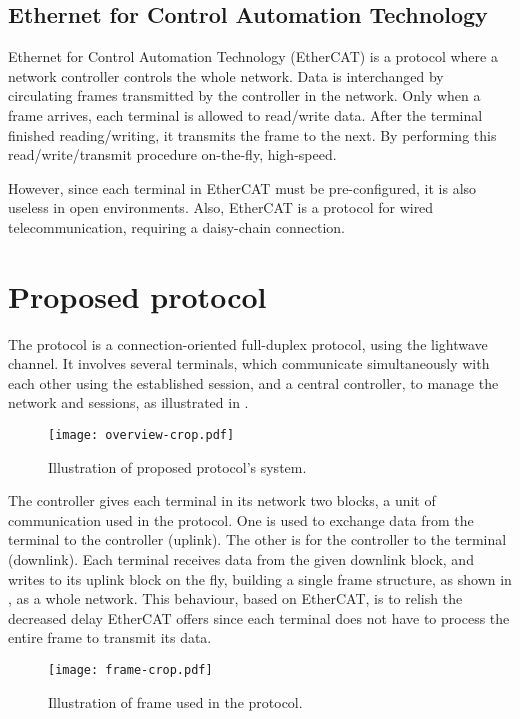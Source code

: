 ﻿\documentclass[twocolumn,9pt]{ltjsarticle}
\renewcommand{\ref}{\Cref}
\begin{document}
\subsection{Ethernet for Control Automation Technology}
Ethernet for Control Automation Technology (EtherCAT) is a protocol where a network controller controls the whole network.
Data is interchanged by circulating frames transmitted by the controller in the network.
Only when a frame arrives, each terminal is allowed to read/write data.
After the terminal finished reading/writing, it transmits the frame to the next.
By performing this read/write/transmit procedure on-the-fly, high-speed.

However, since each terminal in EtherCAT must be pre-configured, it is also useless in open environments.
Also, EtherCAT is a protocol for wired telecommunication, requiring a daisy-chain connection.

\section{Proposed protocol}
The protocol is a connection-oriented full-duplex protocol, using the lightwave channel.
It involves several terminals, which communicate simultaneously with each other using the established session, and a central controller, to manage the network and sessions, as illustrated in \ref{fig:overview}.

\begin{figure}[tb]
  \centering
  \texttt{[image: overview-crop.pdf]}
  \caption{\label{fig:overview}
    Illustration of proposed protocol's system.
  }
\end{figure}

The controller gives each terminal in its network two blocks, a unit of communication used in the protocol.
One is used to exchange data from the terminal to the controller (uplink).
The other is for the controller to the terminal (downlink).
Each terminal receives data from the given downlink block, and writes to its uplink block on the fly, building a single frame structure, as shown in \ref{fig:frame}, as a whole network.
This behaviour, based on EtherCAT, is to relish the decreased delay EtherCAT offers since each terminal does not have to process the entire frame to transmit its data.
\begin{figure}[tb]
  \centering
  \texttt{[image: frame-crop.pdf]}
  \caption{\label{fig:frame}
    Illustration of frame used in the protocol.
  }
\end{figure}
\end{document}

